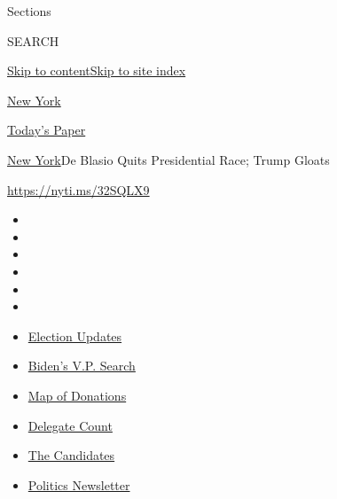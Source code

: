 Sections

SEARCH

\protect\hyperlink{site-content}{Skip to
content}\protect\hyperlink{site-index}{Skip to site index}

\href{https://www.nytimes.com/section/nyregion}{New York}

\href{https://myaccount.nytimes.com/auth/login?response_type=cookie\&client_id=vi}{}

\href{https://www.nytimes.com/section/todayspaper}{Today's Paper}

\href{/section/nyregion}{New York}\textbar{}De Blasio Quits Presidential
Race; Trump Gloats

\url{https://nyti.ms/32SQLX9}

\begin{itemize}
\item
\item
\item
\item
\item
\item
\end{itemize}

\begin{itemize}
\item
  \href{https://www.nytimes.com/2020/07/31/us/elections/biden-vs-trump.html?action=click\&pgtype=Article\&state=default\&region=TOP_BANNER\&context=storylines_menu}{Election
  Updates}
\item
  \href{https://www.nytimes.com/article/biden-vice-president-2020.html?action=click\&pgtype=Article\&state=default\&region=TOP_BANNER\&context=storylines_menu}{Biden's
  V.P. Search}
\item
  \href{https://www.nytimes.com/interactive/2020/07/24/us/politics/trump-biden-campaign-donors.html?action=click\&pgtype=Article\&state=default\&region=TOP_BANNER\&context=storylines_menu}{Map
  of Donations}
\item
  \href{https://www.nytimes.com/interactive/2020/us/elections/delegate-count-primary-results.html?action=click\&pgtype=Article\&state=default\&region=TOP_BANNER\&context=storylines_menu}{Delegate
  Count}
\item
  \href{https://www.nytimes.com/interactive/2019/us/politics/2020-presidential-candidates.html?action=click\&pgtype=Article\&state=default\&region=TOP_BANNER\&context=storylines_menu}{The
  Candidates}
\item
  \href{https://www.nytimes.com/newsletters/politics?action=click\&pgtype=Article\&state=default\&region=TOP_BANNER\&context=storylines_menu}{Politics
  Newsletter}
\end{itemize}

